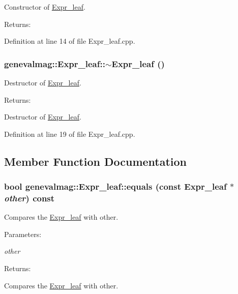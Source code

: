 Constructor of \hyperlink{classgenevalmag_1_1Expr__leaf}{Expr\_\-leaf}. \begin{Desc}
\item[Returns:]\end{Desc}


Definition at line 14 of file Expr\_\-leaf.cpp.\hypertarget{classgenevalmag_1_1Expr__leaf_435c12ce45debdded6be221b0da68c7e}{
\subsubsection[{$\sim$Expr\_\-leaf}]{\setlength{\rightskip}{0pt plus 5cm}genevalmag::Expr\_\-leaf::$\sim$Expr\_\-leaf ()}}
\label{classgenevalmag_1_1Expr__leaf_435c12ce45debdded6be221b0da68c7e}


Destructor of \hyperlink{classgenevalmag_1_1Expr__leaf}{Expr\_\-leaf}. \begin{Desc}
\item[Returns:]\end{Desc}
Destructor of \hyperlink{classgenevalmag_1_1Expr__leaf}{Expr\_\-leaf}. 

Definition at line 19 of file Expr\_\-leaf.cpp.

\subsection{Member Function Documentation}
\hypertarget{classgenevalmag_1_1Expr__leaf_115a2d203c018eab86e8973b610f7d28}{
\subsubsection[{equals}]{\setlength{\rightskip}{0pt plus 5cm}bool genevalmag::Expr\_\-leaf::equals (const {\bf Expr\_\-leaf} $\ast$ {\em other}) const}}
\label{classgenevalmag_1_1Expr__leaf_115a2d203c018eab86e8973b610f7d28}


Compares the \hyperlink{classgenevalmag_1_1Expr__leaf}{Expr\_\-leaf} with other. \begin{Desc}
\item[Parameters:]
\begin{description}
\item[{\em other}]\end{description}
\end{Desc}
\begin{Desc}
\item[Returns:]\end{Desc}
Compares the \hyperlink{classgenevalmag_1_1Expr__leaf}{Expr\_\-leaf} with other. 

